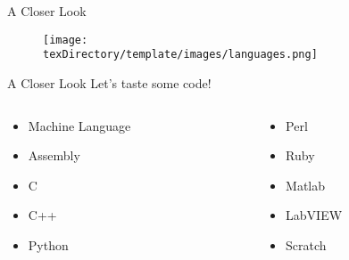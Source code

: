 \documentclass[10pt, compress]{beamer}
\begin{document}
\begin{slide}
	\begin{block}{A Closer Look}
		\begin{figure}\centering
			\texttt{[image: \\texDirectory/template/images/languages.png]}
		\end{figure}
	\end{block}
\end{slide}

\begin{slide}
	\begin{block}{A Closer Look}
		Let's taste some code!
		\begin{columns}
			\begin{column}{0.5\textwidth}
			\begin{itemize}
				\item[] Machine Language
				\item[] Assembly
				\item[] C
				\item[] C++
				\item[] Python
			\end{itemize}
			\end{column}
			\begin{column}{0.5\textwidth}
			\begin{itemize}
				\item[] Perl
				\item[] Ruby
				\item[] Matlab
				\item[] LabVIEW
				\item[] Scratch
			\end{itemize}
			\end{column}
		\end{columns}
	\end{block}
\end{slide}

\end{document}

